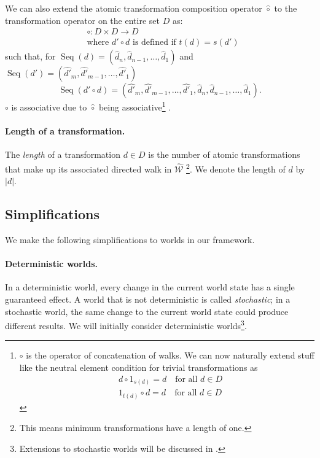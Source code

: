We can also extend the atomic transformation composition operator $\hat{\circ}$ to the transformation operator on the entire set $D$ as:
\begin{equation}
\begin{aligned}
	& \circ: D \times D \to D \\
	& \text{where $d' \circ d$ is defined if $t(d) = s(d')$}
\end{aligned}
\end{equation}
such that, for $\operatorname{Seq}(d) = (\hat{d}_{n}, \hat{d}_{n-1}, \dots, \hat{d}_{1})$ and $\operatorname{Seq}(d') = (\hat{d'}_{m}, \hat{d'}_{m-1}, \dots, \hat{d'}_{1})$
\begin{equation}
	\operatorname{Seq}(d' \circ d) = (\hat{d'}_{m}, \hat{d'}_{m-1}, \dots, \hat{d'}_{1}, \hat{d}_{n}, \hat{d}_{n-1}, \dots, \hat{d}_{1}).
\end{equation}
$\circ$ is associative due to $\hat{\circ}$ being associative\footnote{
$\circ$ is the operator of concatenation of walks.
	We can now naturally extend stuff like the neutral element condition for trivial transformations as
	\begin{align}
		& d \circ 1_{s(d)} = d \quad \text{for all $d \in D$} \\
		& 1_{t(d)} \circ d = d \quad \text{for all $d \in D$}
	\end{align}
}
.


\paragraph{Length of a transformation.}
The \emph{length} of a transformation $d \in D$ is the number of atomic transformations that make up its associated directed walk in $\hat{\mathscr{W}}$ \footnote{
	This means minimum transformations have a length of one.
}.
We denote the length of $d$ by $|d|$.




\subsection{Simplifications}

We make the following simplifications to worlds in our framework.

\paragraph{Deterministic worlds.}
In a deterministic world, every change in the current world state has a single guaranteed effect.
A world that is not deterministic is called \emph{stochastic}; in a stochastic world, the same change to the current world state could produce different results.
We will initially consider deterministic worlds\footnote{Extensions to stochastic worlds will be discussed in .
}.

